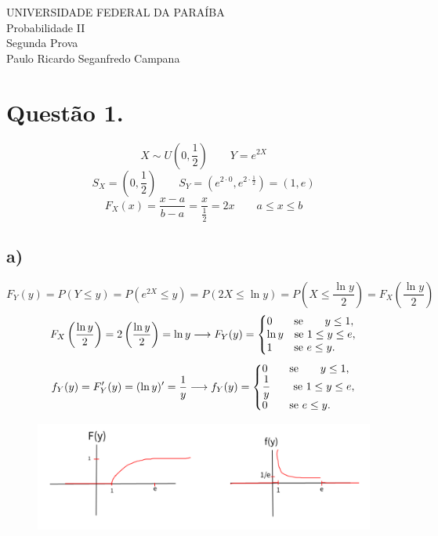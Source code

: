\documentclass[12pt]{article}
\begin{document}
\setcounter{secnumdepth}{0}
\begin{center}
	UNIVERSIDADE FEDERAL DA PARAÍBA\\
	Probabilidade II\\
	Segunda Prova\\
	Paulo Ricardo Seganfredo Campana
\end{center}

\section{Questão 1.}

\[X \sim U \left( 0, \dfrac{1}{2} \right) \qquad Y = e^{2X}\]
\[S_{X} = \left( 0, \dfrac{1}{2} \right) \qquad S_{Y} = (e^{2 \cdot 0}, e^{2 \cdot \frac{1}{2}}) = (1, e)\]
\[F_{X}(x) = \dfrac{x-a}{b-a} = \dfrac{x}{\frac{1}{2}} = 2x \qquad a \leq x \leq b\]

\subsection{a)}

\[F_{Y}(y) = P(Y \leq y) = P(e^{2X} \leq y) = P(2X \leq \ln y) = P \left( X \leq \dfrac{\ln y}{2} \right) = F_{X} \left( \dfrac{\ln y}{2} \right)\]
\[F_{X} \left( \dfrac{\ln y}{2} \right) = 2\left( \dfrac{\ln y}{2} \right) = \ln y \longrightarrow F_{Y}(y) =
\left\{ \begin{array}{@{}l@{}}
	0 \qquad \text{se} \qquad y \leq 1, \\
	\ln y \quad \text{se } 1 \leq y \leq e, \\
	1 \qquad \text{se } e \leq y.  \\
\end{array} \right.\]
\[f_{Y}(y) = F_{Y}'(y) = (\ln y)' = \dfrac{1}{y} \longrightarrow f_{Y}(y) =
\left\{ \begin{array}{@{}l@{}}
	0 \qquad \text{se} \qquad y \leq 1, \\
	\dfrac{1}{y} \hspace{+21pt} \text{se } 1 \leq y \leq e, \\
	0 \qquad \text{se } e \leq y.  \\
\end{array} \right.\]

\begin{figure}[h!]
	\includegraphics[scale=0.45]{q1}
\end{figure}
\end{document}
